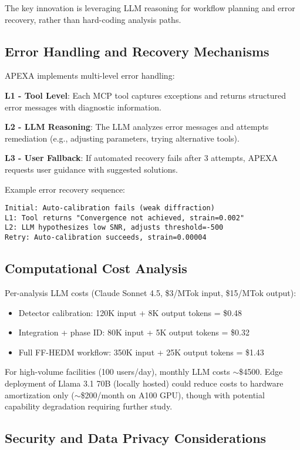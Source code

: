 \documentclass[11pt]{article}
\begin{document}
The key innovation is leveraging LLM reasoning for workflow planning and error recovery, rather than hard-coding analysis paths.

\subsection{Error Handling and Recovery Mechanisms}

APEXA implements multi-level error handling:

\textbf{L1 - Tool Level}: Each MCP tool captures exceptions and returns structured error messages with diagnostic information.

\textbf{L2 - LLM Reasoning}: The LLM analyzes error messages and attempts remediation (e.g., adjusting parameters, trying alternative tools).

\textbf{L3 - User Fallback}: If automated recovery fails after 3 attempts, APEXA requests user guidance with suggested solutions.

Example error recovery sequence:
\begin{lstlisting}
Initial: Auto-calibration fails (weak diffraction)
L1: Tool returns "Convergence not achieved, strain=0.002"
L2: LLM hypothesizes low SNR, adjusts threshold=-500
Retry: Auto-calibration succeeds, strain=0.00004
\end{lstlisting}

\subsection{Computational Cost Analysis}

Per-analysis LLM costs (Claude Sonnet 4.5, \$3/MTok input, \$15/MTok output):

\begin{itemize}
    \item Detector calibration: 120K input + 8K output tokens = \$0.48
    \item Integration + phase ID: 80K input + 5K output tokens = \$0.32
    \item Full FF-HEDM workflow: 350K input + 25K output tokens = \$1.43
\end{itemize}

For high-volume facilities (100 users/day), monthly LLM costs $\sim$\$4500. Edge deployment of Llama 3.1 70B (locally hosted) could reduce costs to hardware amortization only ($\sim$\$200/month on A100 GPU), though with potential capability degradation requiring further study.

\subsection{Security and Data Privacy Considerations}
\end{document}
